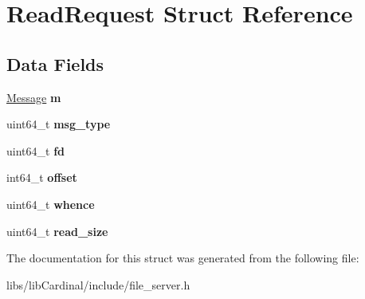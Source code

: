 \hypertarget{structReadRequest}{}\section{Read\+Request Struct Reference}
\label{structReadRequest}
\subsection*{Data Fields}
\begin{DoxyCompactItemize}
\item 
\hyperlink{structMessage}{Message} {\bfseries m}\hypertarget{structReadRequest_a6d854933bde28bd0188598bdc46cfed4}{}\label{structReadRequest_a6d854933bde28bd0188598bdc46cfed4}

\item 
uint64\+\_\+t {\bfseries msg\+\_\+type}\hypertarget{structReadRequest_a0a9abc81f60a8eff4e5926780705dfe6}{}\label{structReadRequest_a0a9abc81f60a8eff4e5926780705dfe6}

\item 
uint64\+\_\+t {\bfseries fd}\hypertarget{structReadRequest_a3c47561a93f7996886af3b929de83606}{}\label{structReadRequest_a3c47561a93f7996886af3b929de83606}

\item 
int64\+\_\+t {\bfseries offset}\hypertarget{structReadRequest_a2bc15b411f9a7d9859ea7f85854147c0}{}\label{structReadRequest_a2bc15b411f9a7d9859ea7f85854147c0}

\item 
uint64\+\_\+t {\bfseries whence}\hypertarget{structReadRequest_a35ef59de37c9a5ba96476fbce33411d6}{}\label{structReadRequest_a35ef59de37c9a5ba96476fbce33411d6}

\item 
uint64\+\_\+t {\bfseries read\+\_\+size}\hypertarget{structReadRequest_a3768d2df917efe92e21b576ee0e90522}{}\label{structReadRequest_a3768d2df917efe92e21b576ee0e90522}

\end{DoxyCompactItemize}


The documentation for this struct was generated from the following file\+:\begin{DoxyCompactItemize}
\item 
libs/lib\+Cardinal/include/file\+\_\+server.\+h\end{DoxyCompactItemize}
